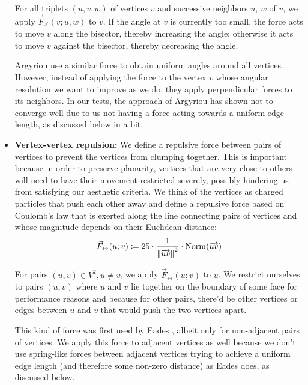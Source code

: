 \begin{itemize}
For all triplets $(u,v,w)$ of vertices $v$ and successive neighbors $u$, $w$ of $v$, we apply $\vec{F}_\measuredangle(v;u,w)$ to $v$.
If the angle at $v$ is currently too small, the force acts to move $v$ along the bisector, thereby increasing the angle; otherwise it acts to move $v$ against the bisector, thereby decreasing the angle.

Argyriou \etal{} \cite{argyriou2013maximizing} use a similar force to obtain uniform angles around all vertices.
However, instead of applying the force to the vertex $v$ whose angular resolution we want to improve as we do, they apply perpendicular forces to its neighbors.
In our tests, the approach of Argyriou \etal{} has shown not to converge well due to us not having a force acting towards a uniform edge length, as discussed below in a bit.


\item \textbf{Vertex-vertex repulsion:} %
We define a repulsive force between pairs of vertices to prevent the vertices from clumping together.
This is important because in order to preserve planarity, vertices that are very close to others will need to have their movement restricted severely, possibly hindering us from satisfying our aesthetic criteria.
We think of the vertices as charged particles that push each other away and define a repulsive force based on Coulomb's law that is exerted along the line connecting pairs of vertices and whose magnitude depends on their Euclidean distance:
%
\begin{equation}
	\vec{F}_\leftrightarrow(u;v) \coloneqq
	25 \cdot \frac{1}{\left\lVert\overrightarrow{uv}\right\rVert^2}
	\cdot \operatorname{Norm}(\overrightarrow{uv})
\end{equation}

For pairs $(u, v) \in V^2, u \neq v$, we apply $\vec{F}_\leftrightarrow(u;v)$ to $u$.
We restrict ourselves to pairs $(u,v)$ where $u$ and $v$ lie together on the boundary of some face for performance reasons and because for other pairs, there'd be other vertices or edges between $u$ and $v$ that would push the two vertices apart.

This kind of force was first used by Eades \cite{eades84heuristic}, albeit only for non-adjacent pairs of vertices.
We apply this force to adjacent vertices as well because we don't use spring-like forces between adjacent vertices trying to achieve a uniform edge length (and therefore some non-zero distance) as Eades does, as discussed below.



\end{itemize}
